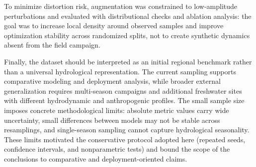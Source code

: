 To minimize distortion risk, augmentation was constrained to low-amplitude perturbations and evaluated with distributional checks and ablation analysis: the goal was to increase local density around observed samples and improve optimization stability across randomized splits, not to create synthetic dynamics absent from the field campaign.

Finally, the dataset should be interpreted as an initial regional benchmark rather than a universal hydrological representation. The current sampling supports comparative modeling and deployment analysis, while broader external generalization requires multi-season campaigns and additional freshwater sites with different hydrodynamic and anthropogenic profiles. The small sample size imposes concrete methodological limits: absolute metric values carry wide uncertainty, small differences between models may not be stable across resamplings, and single-season sampling cannot capture hydrological seasonality. These limits motivated the conservative protocol adopted here (repeated seeds, confidence intervals, and nonparametric tests) and bound the scope of the conclusions to comparative and deployment-oriented claims.
